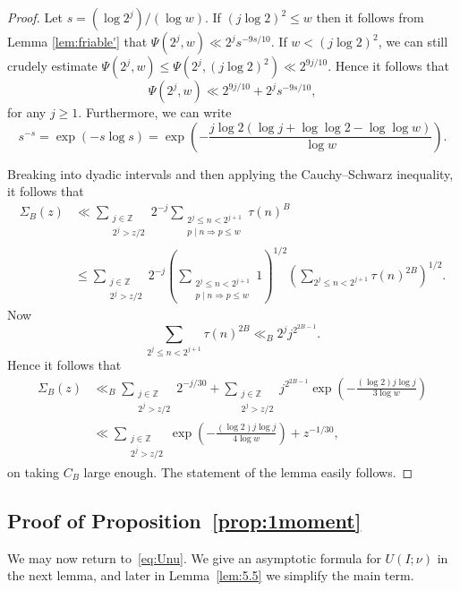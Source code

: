 \documentclass[11pt,letterpaper]{amsart}
\renewcommand{\leq}{\leqslant}
\renewcommand{\geq}{\geqslant}
\theoremstyle{definition}
\numberwithin{equation}{section}
\newcommand\ZZ{\mathbb{Z}}
\newcommand{\0}{\mathbf{0}}
\begin{document}
\begin{proof} 
Let $s=(\log 2^j)/(\log w)$. 
If $(j\log 2)^2\leq w$ then it follows from 
Lemma 
\ref{lem:friable'}  that
$\Psi(2^j,w)\ll 2^{j}s^{-9s/10}$.
If 
$w<(j\log 2)^2$, we can still crudely estimate
$\Psi(2^j,w)\leq \Psi(2^j,(j\log 2)^2)\ll 2^{9j/10}$. Hence it follows that 
$$
\Psi(2^j,w)\ll 2^{9j/10}+2^{j}s^{-9s/10},
$$
for any $j\geq 1$. Furthermore, we can write
$$
s^{-s}=\exp\left(-s\log s\right)=\exp\left(-\frac{j\log 2(\log j +\log\log 2-\log\log w)}{\log w}\right).
$$


Breaking into dyadic intervals and then applying the Cauchy--Schwarz inequality, it follows that 
\begin{align*}
\Sigma_{B}(z) &\ll
 \sum_{\substack{j\in \ZZ \\ 2^j>z/2}} 2^{-j}\sum_{\substack{2^j\leq n<2^{j+1}\\p\mid n\Rightarrow p\leq w}}\tau(n)^{B}\\
&\leq  \sum_{\substack{j\in \ZZ \\ 2^j>z/2}} 2^{-j}\left(\sum_{\substack{2^j\leq n<2^{j+1}\\p\mid n\Rightarrow p\leq w}}1\right)^{1/2}\left(\sum_{2^j\leq n<2^{j+1}}\tau(n)^{2B}\right)^{1/2}.
\end{align*}
Now 
$$
\sum_{2^j\leq n<2^{j+1}}\tau(n)^{2B}\ll_B 2^j j^{2^{2B-1}}.
$$
Hence it follows that 
\begin{align*}
\Sigma_{B}(z) 
&\ll_B  
\sum_{\substack{j\in \ZZ \\ 2^j> z/2}}2^{-j/30} +
\sum_{\substack{j\in \ZZ \\ 2^j> z/2}} j^{2^{2B-1}}
\exp\left(-\frac{(\log 2)j\log j}{3\log w} \right)\\
&\ll \sum_{\substack{j\in \ZZ \\ 2^j> z/2}} 
\exp\left(-\frac{(\log 2)j\log j}{4\log w} \right)+z^{-1/30},
 \end{align*}
on taking $C_B$ large enough. The statement of the lemma easily follows. 
\end{proof}

\subsection{Proof of Proposition~\ref{prop:1moment}}


We may now return to~\eqref{eq:Unu}. We give an asymptotic formula for $U(I;\nu)$ in the next lemma, and later in Lemma~\ref{lem:5.5} we simplify the main term.
\end{document}
